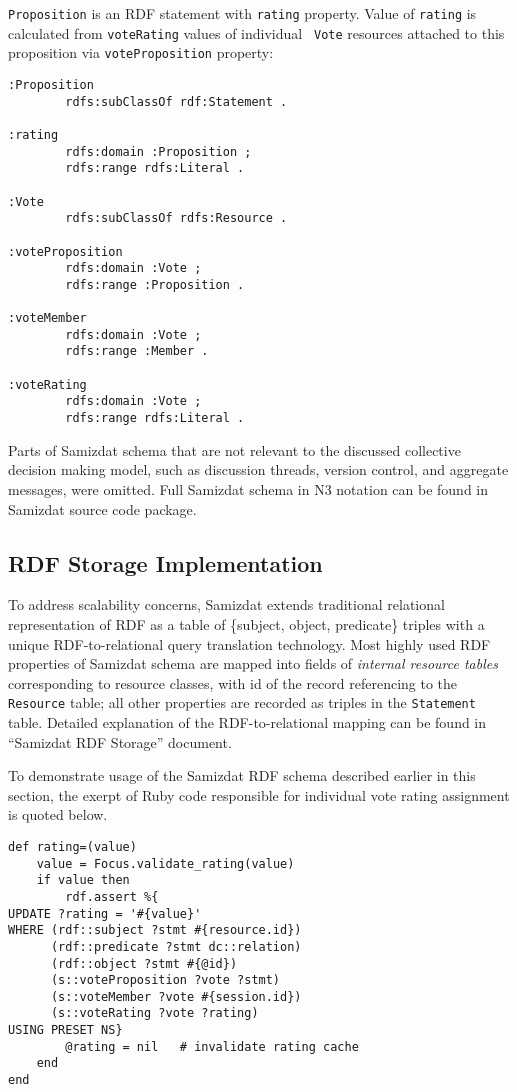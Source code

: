 \documentclass{llncs}
\begin{document}
{\tt Proposition} is an RDF statement with {\tt rating} property. Value of
{\tt rating} is calculated from {\tt voteRating} values of individual {\tt
Vote} resources attached to this proposition via {\tt voteProposition}
property:

\begin{verbatim}
:Proposition
        rdfs:subClassOf rdf:Statement .

:rating
        rdfs:domain :Proposition ;
        rdfs:range rdfs:Literal .

:Vote
        rdfs:subClassOf rdfs:Resource .

:voteProposition
        rdfs:domain :Vote ;
        rdfs:range :Proposition .

:voteMember
        rdfs:domain :Vote ;
        rdfs:range :Member .

:voteRating
        rdfs:domain :Vote ;
        rdfs:range rdfs:Literal .
\end{verbatim}

Parts of Samizdat schema that are not relevant to the discussed collective
decision making model, such as discussion threads, version control, and
aggregate messages, were omitted. Full Samizdat schema in N3 notation can be
found in Samizdat source code package.

\subsection{RDF Storage Implementation}

To address scalability concerns, Samizdat extends traditional relational
representation of RDF as a table of \{subject, object, predicate\} triples
with a unique RDF-to-relational query translation technology. Most highly used
RDF properties of Samizdat schema are mapped into fields of \emph{internal
resource tables} corresponding to resource classes, with id of the record
referencing to the {\tt Resource} table; all other properties are recorded as
triples in the {\tt Statement} table. Detailed explanation of the
RDF-to-relational mapping can be found in ``Samizdat RDF
Storage''\cite{rdf-storage} document.

To demonstrate usage of the Samizdat RDF schema described earlier in this
section, the exerpt of Ruby code responsible for individual vote rating
assignment is quoted below.

\begin{verbatim}
def rating=(value)
    value = Focus.validate_rating(value)
    if value then
        rdf.assert %{
UPDATE ?rating = '#{value}'
WHERE (rdf::subject ?stmt #{resource.id})
      (rdf::predicate ?stmt dc::relation)
      (rdf::object ?stmt #{@id})
      (s::voteProposition ?vote ?stmt)
      (s::voteMember ?vote #{session.id})
      (s::voteRating ?vote ?rating)
USING PRESET NS}
        @rating = nil   # invalidate rating cache
    end
end
\end{verbatim}
\end{document}
